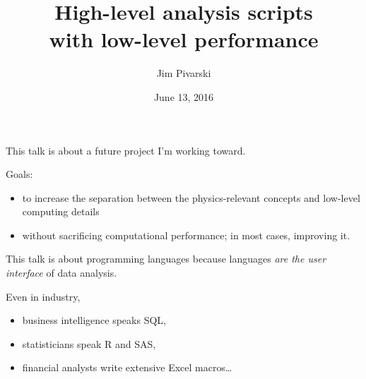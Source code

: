 \documentclass{beamer}
\title[2016-06-13-high-level-low-level]{High-level analysis scripts \\ with low-level performance}
\author{Jim Pivarski}
\institute{Princeton University -- DIANA}
\date{June 13, 2016}
\begin{document}

\begin{frame}
  \titlepage
\end{frame}



\begin{frame}{}
\vfill
This talk is about a future project I'm working toward.

\vfill
\begin{block}{Goals:}
\begin{itemize}
\item to increase the separation between the physics-relevant concepts and low-level computing details
\item without sacrificing computational performance; in most cases, improving it.
\end{itemize}
\end{block}
\end{frame}

\begin{frame}{}
\vfill
This talk is about programming languages because languages {\it are the user interface} of data analysis.

\vfill
Even in industry,
\begin{itemize}
\item business intelligence speaks SQL,
\item statisticians speak R and SAS,
\item financial analysts write extensive Excel macros\ldots
\end{itemize}
\end{frame}
\end{document}

